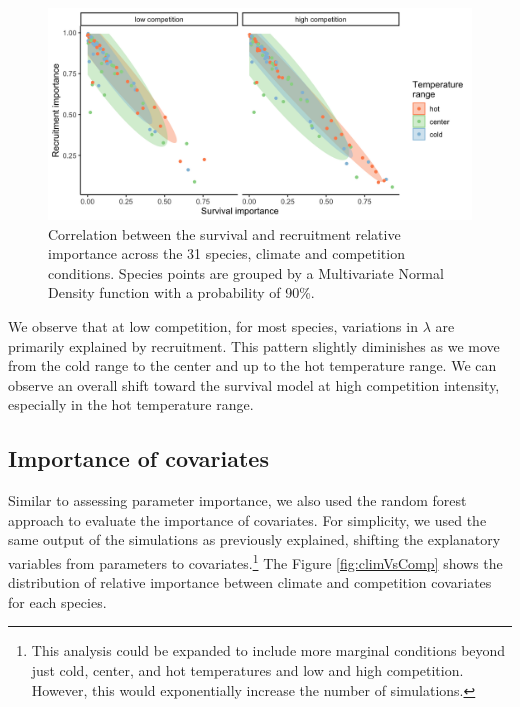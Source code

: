 \hypertarget{fig:recVsMort}{%
\begin{figure}
\centering
\includegraphics{manuscript/figs/fig-recVsMort-1.png}
\caption[{Correlation between the survival and recruitment relative
importance across the 31 species, climate and competition
conditions.}]{Correlation between the survival and recruitment relative
importance across the 31 species, climate and competition conditions.
Species points are grouped by a Multivariate Normal Density function
with a probability of 90\%.}
\label{fig:recVsMort}
\end{figure}
}

We observe that at low competition, for most species, variations in
\(\lambda\) are primarily explained by recruitment. This pattern
slightly diminishes as we move from the cold range to the center and up
to the hot temperature range. We can observe an overall shift toward the
survival model at high competition intensity, especially in the hot
temperature range.\\

\hypertarget{importance-of-covariates}{%
\subsection{Importance of covariates}\label{importance-of-covariates}}

Similar to assessing parameter importance, we also used the random
forest approach to evaluate the importance of covariates. For
simplicity, we used the same output of the simulations as previously
explained, shifting the explanatory variables from parameters to
covariates.\footnote{This analysis could be expanded to include more
  marginal conditions beyond just cold, center, and hot temperatures and
  low and high competition. However, this would exponentially increase
  the number of simulations.} The Figure \ref{fig:climVsComp} shows the
distribution of relative importance between climate and competition
covariates for each species.\\

